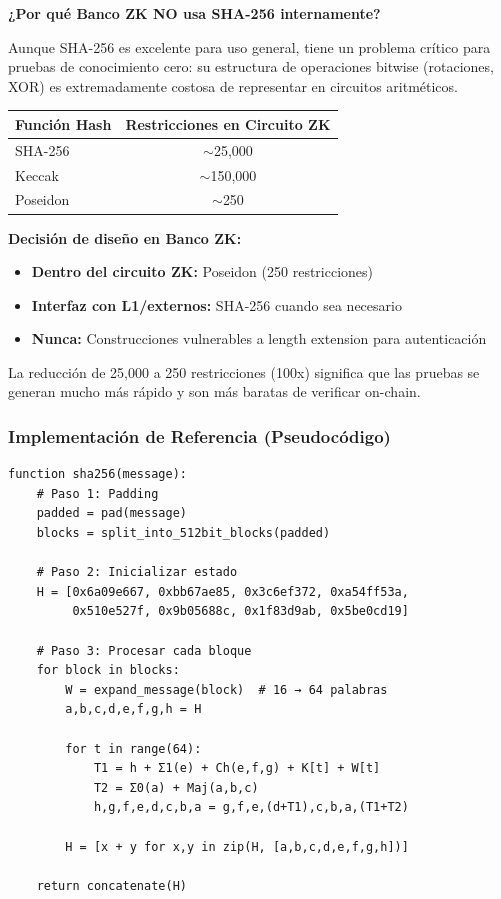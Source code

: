 \documentclass[11pt,a4paper,twoside,openright]{book}
\theoremstyle{definition}
\theoremstyle{plain}
\theoremstyle{remark}
\begin{document}
\begin{bancozk}
\textbf{¿Por qué Banco ZK NO usa SHA-256 internamente?}

Aunque SHA-256 es excelente para uso general, tiene un problema crítico para pruebas de conocimiento cero: su estructura de operaciones bitwise (rotaciones, XOR) es extremadamente costosa de representar en circuitos aritméticos.

\begin{center}
\begin{tabular}{lc}
\toprule
\textbf{Función Hash} & \textbf{Restricciones en Circuito ZK} \\
\midrule
SHA-256 & $\sim$25,000 \\
Keccak & $\sim$150,000 \\
Poseidon & $\sim$250 \\
\bottomrule
\end{tabular}
\end{center}

\textbf{Decisión de diseño en Banco ZK:}
\begin{itemize}
    \item \textbf{Dentro del circuito ZK:} Poseidon (250 restricciones)
    \item \textbf{Interfaz con L1/externos:} SHA-256 cuando sea necesario
    \item \textbf{Nunca:} Construcciones vulnerables a length extension para autenticación
\end{itemize}

La reducción de 25,000 a 250 restricciones (100x) significa que las pruebas se generan mucho más rápido y son más baratas de verificar on-chain.
\end{bancozk}

\subsubsection{Implementación de Referencia (Pseudocódigo)}

\begin{verbatim}
function sha256(message):
    # Paso 1: Padding
    padded = pad(message)
    blocks = split_into_512bit_blocks(padded)
    
    # Paso 2: Inicializar estado
    H = [0x6a09e667, 0xbb67ae85, 0x3c6ef372, 0xa54ff53a,
         0x510e527f, 0x9b05688c, 0x1f83d9ab, 0x5be0cd19]
    
    # Paso 3: Procesar cada bloque
    for block in blocks:
        W = expand_message(block)  # 16 → 64 palabras
        a,b,c,d,e,f,g,h = H
        
        for t in range(64):
            T1 = h + Σ1(e) + Ch(e,f,g) + K[t] + W[t]
            T2 = Σ0(a) + Maj(a,b,c)
            h,g,f,e,d,c,b,a = g,f,e,(d+T1),c,b,a,(T1+T2)
        
        H = [x + y for x,y in zip(H, [a,b,c,d,e,f,g,h])]
    
    return concatenate(H)
\end{verbatim}
\end{document}
